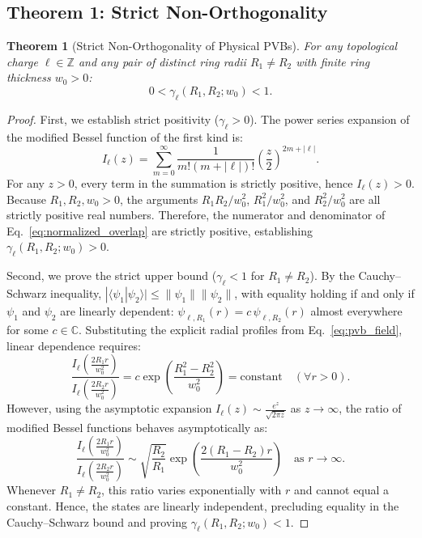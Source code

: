 \documentclass[11pt,a4paper]{article}
\newtheorem{theorem}{Theorem}
\begin{document}
\subsection{Theorem 1: Strict Non-Orthogonality}

\begin{theorem}[Strict Non-Orthogonality of Physical PVBs]
For any topological charge $\ell \in \mathbb{Z}$ and any pair of distinct ring radii $R_1 \neq R_2$ with finite ring thickness $w_0 > 0$:
\begin{equation}
0 < \gamma_\ell(R_1, R_2; w_0) < 1.
\end{equation}
\end{theorem}

\begin{proof}
First, we establish strict positivity ($\gamma_\ell > 0$). The power series expansion of the modified Bessel function of the first kind is:
\begin{equation}
I_\ell(z) = \sum_{m=0}^\infty \frac{1}{m! (m + |\ell|)!} \left(\frac{z}{2}\right)^{2m + |\ell|}.
\end{equation}
For any $z > 0$, every term in the summation is strictly positive, hence $I_\ell(z) > 0$. Because $R_1, R_2, w_0 > 0$, the arguments $R_1 R_2 / w_0^2$, $R_1^2 / w_0^2$, and $R_2^2 / w_0^2$ are all strictly positive real numbers. Therefore, the numerator and denominator of Eq.~\eqref{eq:normalized_overlap} are strictly positive, establishing $\gamma_\ell(R_1, R_2; w_0) > 0$.

Second, we prove the strict upper bound ($\gamma_\ell < 1$ for $R_1 \neq R_2$). By the Cauchy--Schwarz inequality, $|\langle \psi_1 | \psi_2 \rangle| \le \|\psi_1\| \|\psi_2\|$, with equality holding if and only if $\psi_1$ and $\psi_2$ are linearly dependent: $\psi_{\ell, R_1}(r) = c \, \psi_{\ell, R_2}(r)$ almost everywhere for some $c \in \mathbb{C}$. Substituting the explicit radial profiles from Eq.~\eqref{eq:pvb_field}, linear dependence requires:
\begin{equation}
\frac{I_\ell\left( \frac{2 R_1 r}{w_0^2} \right)}{I_\ell\left( \frac{2 R_2 r}{w_0^2} \right)} = c \exp\left( \frac{R_1^2 - R_2^2}{w_0^2} \right) = \text{constant} \quad (\forall r > 0).
\end{equation}
However, using the asymptotic expansion $I_\ell(z) \sim \frac{e^z}{\sqrt{2\pi z}}$ as $z \to \infty$, the ratio of modified Bessel functions behaves asymptotically as:
\begin{equation}
\frac{I_\ell\left( \frac{2 R_1 r}{w_0^2} \right)}{I_\ell\left( \frac{2 R_2 r}{w_0^2} \right)} \sim \sqrt{\frac{R_2}{R_1}} \exp\left( \frac{2(R_1 - R_2) r}{w_0^2} \right) \quad \text{as } r \to \infty.
\end{equation}
Whenever $R_1 \neq R_2$, this ratio varies exponentially with $r$ and cannot equal a constant. Hence, the states are linearly independent, precluding equality in the Cauchy--Schwarz bound and proving $\gamma_\ell(R_1, R_2; w_0) < 1$.
\end{proof}
\end{document}
